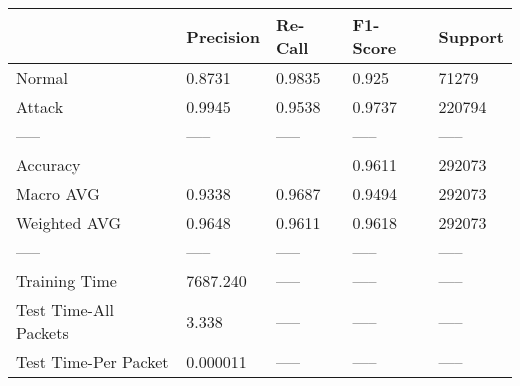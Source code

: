 \begin{tabular}{lllll}
\toprule
{} & Precision & Re-Call & F1-Score & Support \\
\midrule
Normal                &    0.8731 &  0.9835 &    0.925 &   71279 \\
Attack                &    0.9945 &  0.9538 &   0.9737 &  220794 \\
-----                 &     ----- &   ----- &    ----- &   ----- \\
Accuracy              &           &         &   0.9611 &  292073 \\
Macro AVG             &    0.9338 &  0.9687 &   0.9494 &  292073 \\
Weighted AVG          &    0.9648 &  0.9611 &   0.9618 &  292073 \\
-----                 &     ----- &   ----- &    ----- &   ----- \\
Training Time         &  7687.240 &   ----- &    ----- &   ----- \\
Test Time-All Packets &     3.338 &   ----- &    ----- &   ----- \\
Test Time-Per Packet  &  0.000011 &   ----- &    ----- &   ----- \\
\bottomrule
\end{tabular}

